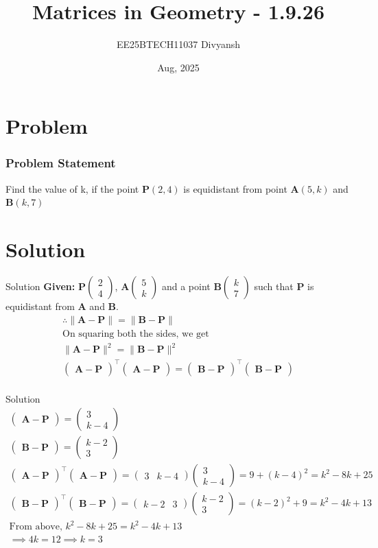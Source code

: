 \documentclass{beamer}
\title{Matrices in Geometry - 1.9.26}
\author{EE25BTECH11037  Divyansh}
\date{Aug, 2025}
\let\vec\mathbf
\providecommand{\brak}[1]{\ensuremath{\left(#1\right)}}
\theoremstyle{remark}
\providecommand{\norm}[1]{\lVert#1\rVert}
\newcommand{\myvec}[1]{\ensuremath{\begin{pmatrix}#1\end{pmatrix}}}
\begin{document}
\maketitle


\begin{frame}
\tableofcontents
\end{frame}


\section{Problem}
\begin{frame}
\frametitle{Problem Statement}
Find the value of k, if the point $\vec{P}\brak{2,4}$ is equidistant from point $\vec{A}\brak{5,k}$ and $\vec{B}\brak{k,7}$
\end{frame}

\section{Solution}
\begin{frame}{Solution}
   \textbf{Given: } 
$\vec{P}\myvec{2\\4}$, $\vec{A}\myvec{5\\k}$ and a point $\vec{B} \myvec{k \\ 7}$ such that $\vec{P}$ is equidistant from $\vec{A}$ and $\vec{B}$. 
\begin{align*}
    \therefore \norm{\vec{A}-\vec{P}}=\norm{\vec{B}-\vec{P}}\\
    \text{On squaring both the sides, we get }\\
    \norm{\vec{A}-\vec{P}}^2=\norm{\vec{B}-\vec{P}}^2\\
    \myvec{\vec{A}-\vec{P}}^{\top}\myvec{\vec{A}-\vec{P}}=\myvec{\vec{B}-\vec{P}}^{\top}\myvec{\vec{B}-\vec{P}}\\
\end{align*}
\end{frame}



\begin{frame}{Solution}
\begin{align*}
 \myvec{\vec{A}-\vec{P}}=\myvec{3 \\ k-4}\\
    \myvec{\vec{B}-\vec{P}}=\myvec{k-2 \\ 3}\\
    \myvec{\vec{A}-\vec{P}}^{\top}\myvec{\vec{A}-\vec{P}}=\myvec{3 & k-4}\myvec{3 \\ k-4}=9+\brak{k-4}^2=k^2 - 8k + 25\\
    \myvec{\vec{B}-\vec{P}}^{\top}\myvec{\vec{B}-\vec{P}}=\myvec{k-2 & 3}\myvec{k-2 \\ 3}=\brak{k-2}^2 + 9=k^2 -4k+13\\
    \text{From above, } k^2 - 8k + 25=k^2 -4k+13\\
    \implies 4k=12 \implies k=3
 \end{align*}
\end{frame}
\end{document}
